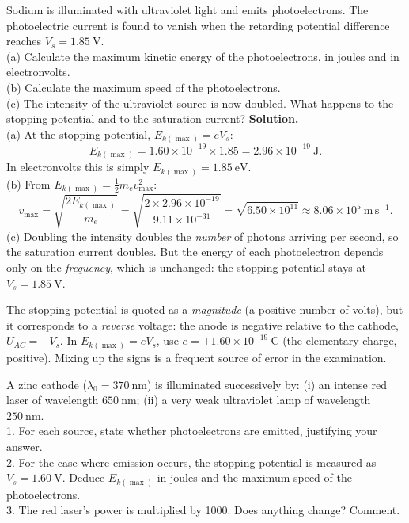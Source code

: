 \documentclass[11pt]{article}
\begin{document}
\begin{exoresolu}
Sodium is illuminated with ultraviolet light and emits photoelectrons. The photoelectric current is found to vanish when the retarding potential difference reaches $V_s = 1.85\ \mathrm{V}$.\\
(a) Calculate the maximum kinetic energy of the photoelectrons, in joules and in electronvolts.\\
(b) Calculate the maximum speed of the photoelectrons.\\
(c) The intensity of the ultraviolet source is now doubled. What happens to the stopping potential and to the saturation current?
\tcblower
\textbf{Solution.}\\
(a) At the stopping potential, $E_{k(\max)} = eV_s$:
\[
E_{k(\max)} = 1.60\times 10^{-19} \times 1.85 = 2.96\times 10^{-19}\ \mathrm{J}.
\]
In electronvolts this is simply $E_{k(\max)} = 1.85\ \mathrm{eV}$.\\[4pt]
(b) From $E_{k(\max)} = \tfrac{1}{2}m_e v_{\max}^2$:
\[
v_{\max} = \sqrt{\frac{2E_{k(\max)}}{m_e}} = \sqrt{\frac{2\times 2.96\times 10^{-19}}{9.11\times 10^{-31}}} = \sqrt{6.50\times 10^{11}} \approx 8.06\times 10^{5}\ \mathrm{m\,s^{-1}}.
\]
(c) Doubling the intensity doubles the \emph{number} of photons arriving per second, so the saturation current doubles. But the energy of each photoelectron depends only on the \emph{frequency}, which is unchanged: the stopping potential stays at $V_s = 1.85\ \mathrm{V}$.
\end{exoresolu}

\begin{attention}
The stopping potential is quoted as a \emph{magnitude} (a positive number of volts), but it corresponds to a \emph{reverse} voltage: the anode is negative relative to the cathode, $U_{AC} = -V_s$. In $E_{k(\max)} = eV_s$, use $e = +1.60\times 10^{-19}\ \mathrm{C}$ (the elementary charge, positive). Mixing up the signs is a frequent source of error in the examination.
\end{attention}

\begin{exercice}
A zinc cathode ($\lambda_0 = 370\ \mathrm{nm}$) is illuminated successively by: (i) an intense red laser of wavelength $650\ \mathrm{nm}$; (ii) a very weak ultraviolet lamp of wavelength $250\ \mathrm{nm}$.\\
1. For each source, state whether photoelectrons are emitted, justifying your answer.\\
2. For the case where emission occurs, the stopping potential is measured as $V_s = 1.60\ \mathrm{V}$. Deduce $E_{k(\max)}$ in joules and the maximum speed of the photoelectrons.\\
3. The red laser's power is multiplied by 1000. Does anything change? Comment.
\end{exercice}
\end{document}
